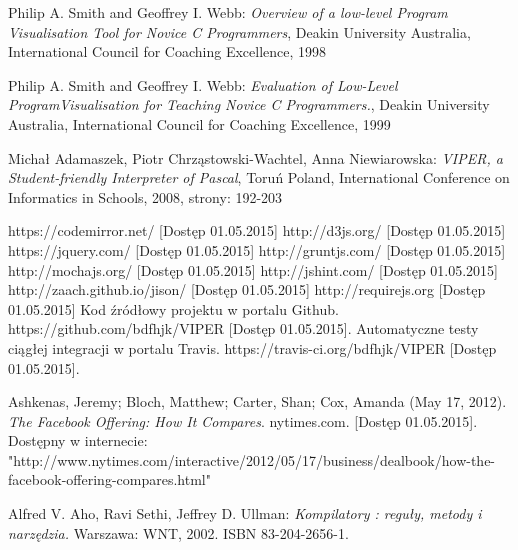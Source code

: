 \documentclass[a4paper,twoside,openright,11pt]{report}
\begin{document}
\begin{thebibliography}{99}
  
   Philip A. Smith and Geoffrey I. Webb: \emph{Overview of a low-level Program Visualisation Tool for Novice C Programmers}, Deakin University Australia, International Council for Coaching Excellence, 1998 
  
   Philip A. Smith and Geoffrey I. Webb: \emph{Evaluation of Low-Level ProgramVisualisation for Teaching Novice C Programmers.}, Deakin University Australia, International Council for Coaching Excellence, 1999
  
   Michał Adamaszek, Piotr Chrząstowski-Wachtel, Anna Niewiarowska: \emph{VIPER, a Student-friendly Interpreter of Pascal}, Toruń Poland, International Conference on Informatics in Schools, 2008, strony: 192-203 
  
   https://codemirror.net/ [Dostęp 01.05.2015]
   http://d3js.org/ [Dostęp 01.05.2015]
   https://jquery.com/ [Dostęp 01.05.2015]
   http://gruntjs.com/ [Dostęp 01.05.2015]
   http://mochajs.org/ [Dostęp 01.05.2015]
   http://jshint.com/ [Dostęp 01.05.2015]
   http://zaach.github.io/jison/ [Dostęp 01.05.2015]
   http://requirejs.org [Dostęp 01.05.2015]
   Kod źródłowy projektu w portalu Github. https://github.com/bdfhjk/VIPER [Dostęp 01.05.2015]. 
   Automatyczne testy ciągłej integracji w portalu Travis. https://travis-ci.org/bdfhjk/VIPER [Dostęp 01.05.2015].

   Ashkenas, Jeremy; Bloch, Matthew; Carter, Shan; Cox, Amanda (May 17, 2012). \emph{The Facebook Offering: How It Compares}. nytimes.com.  [Dostęp 01.05.2015]. Dostępny w internecie: "http://www.nytimes.com/interactive/2012/05/17/business/dealbook/how-the-facebook-offering-compares.html"
  
   Alfred V. Aho, Ravi Sethi, Jeffrey D. Ullman: \emph{Kompilatory : reguły, metody i narzędzia.} Warszawa: WNT, 2002. ISBN 83-204-2656-1.


\end{thebibliography}
\end{document}

